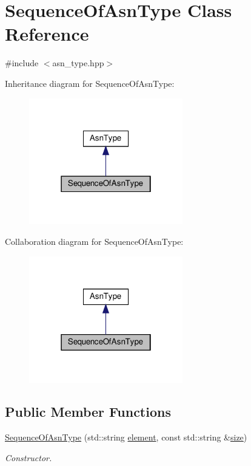 \hypertarget{classSequenceOfAsnType}{}\section{Sequence\+Of\+Asn\+Type Class Reference}
\label{classSequenceOfAsnType}


{\ttfamily \#include $<$asn\+\_\+type.\+hpp$>$}



Inheritance diagram for Sequence\+Of\+Asn\+Type\+:
\nopagebreak
\begin{figure}[H]
\begin{center}
\leavevmode
\includegraphics[width=190pt]{dd/d59/classSequenceOfAsnType__inherit__graph}
\end{center}
\end{figure}


Collaboration diagram for Sequence\+Of\+Asn\+Type\+:
\nopagebreak
\begin{figure}[H]
\begin{center}
\leavevmode
\includegraphics[width=190pt]{d8/d7b/classSequenceOfAsnType__coll__graph}
\end{center}
\end{figure}
\subsection*{Public Member Functions}
\begin{DoxyCompactItemize}
\item 
\hyperlink{classSequenceOfAsnType_a53f4989e17c389c1d37438d4d68b62f6}{Sequence\+Of\+Asn\+Type} (std\+::string \hyperlink{classSequenceOfAsnType_acb3e394c49163d310a53b0faabdcddf2}{element}, const std\+::string \&\hyperlink{classSequenceOfAsnType_adbb06897b056678141962633b00ea6ca}{size})
\begin{DoxyCompactList}\small\item\em Constructor. \end{DoxyCompactList}\end{DoxyCompactItemize}
